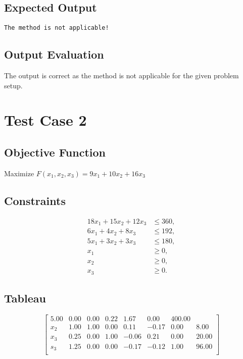 \documentclass[12pt, legalpaper]{exam}
\begin{document}
\subsection*{Expected Output}
\begin{verbatim}
The method is not applicable!
\end{verbatim}

\subsection*{Output Evaluation}
The output is correct as the method is not applicable for the given problem setup.

\section*{Test Case 2}

\subsection*{Objective Function}
Maximize \( F(x_1, x_2, x_3) = 9x_1 + 10x_2 + 16x_3 \)

\subsection*{Constraints}
\begin{align*}
    18x_1 + 15x_2 + 12x_3 &\leq 360, \\
    6x_1 + 4x_2 + 8x_3 &\leq 192, \\
    5x_1 + 3x_2 + 3x_3 &\leq 180, \\
    x_1 &\geq 0, \\
    x_2 &\geq 0, \\
    x_3 &\geq 0.
\end{align*}

\subsection*{Tableau}
\[
\begin{bmatrix}
    5.00 & 0.00 & 0.00 & 0.22 & 1.67 & 0.00 & 400.00 \\
    x_2 & 1.00 & 1.00 & 0.00 & 0.11 & -0.17 & 0.00 & 8.00 \\
    x_3 & 0.25 & 0.00 & 1.00 & -0.06 & 0.21 & 0.00 & 20.00 \\
    s_3 & 1.25 & 0.00 & 0.00 & -0.17 & -0.12 & 1.00 & 96.00 \\
\end{bmatrix}
\]
\end{document}
